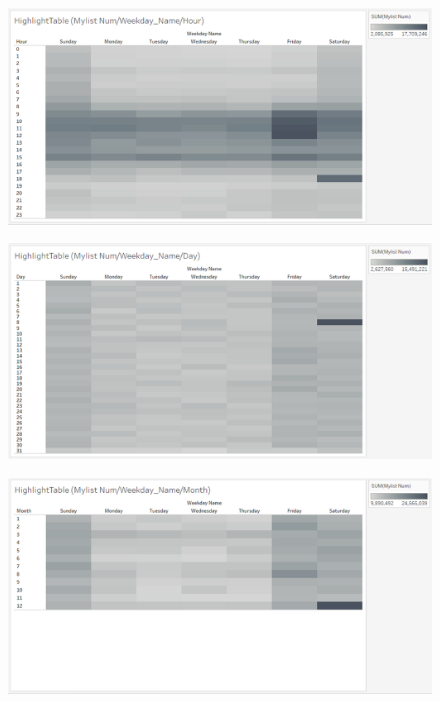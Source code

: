 \documentclass[submit,techrep,noauthor]{ipsj}
\begin{document}
\begin{figure}[h]
  \hspace{-1.0zh}
  \begin{minipage}[b]{0.49\columnwidth}
    \centering
    \hspace{-1.0zh}
    \includegraphics[width=\columnwidth]{./eps/HighlightTable_MylistNum_WeekdayNameHour.eps}
    \label{fig:highlighttable_mylist_weekdaynamehour}
  \end{minipage}
  \begin{minipage}[b]{0.49\columnwidth}
    \centering
    \includegraphics[width=\columnwidth]{./eps/HighlightTable_MylistNum_WeekdayNameDay.eps}
    \label{fig:highlighttable_mylist_weekdaynameday}
  \end{minipage}
  \begin{minipage}[b]{0.49\columnwidth}
    \centering
    \includegraphics[width=\columnwidth]{./eps/HighlightTable_MylistNum_WeekdayNameMonth.eps}

\end{minipage}
\end{figure}
\end{document}
